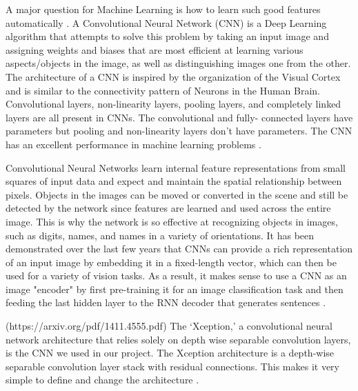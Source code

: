 \documentclass[conference]{IEEEtran}
\begin{document}
A major question for Machine Learning is how to learn such good features automatically \cite{b8}. A Convolutional Neural Network (CNN) is a Deep Learning algorithm that attempts to solve this problem by taking an input image and assigning weights and biases that are most efficient at learning various aspects/objects in the image, as well as distinguishing images one from the other. The architecture of a CNN is inspired by the organization of the Visual Cortex and is similar to the connectivity pattern of Neurons in the Human Brain. Convolutional layers, non-linearity layers, pooling layers, and completely linked layers are all present in CNNs. The convolutional and fully- connected layers have parameters but pooling and non-linearity layers don't have parameters. The CNN has an excellent performance in machine learning problems \cite{b8}.

Convolutional Neural Networks learn internal feature representations from small squares of input data and expect and maintain the spatial relationship between pixels. Objects in the images can be moved or converted in the scene and still be detected by the network since features are learned and used across the entire image. 
This is why the network is so effective at recognizing objects in images, such as digits, names, and names in a variety of orientations. It has been demonstrated over the last few years that CNNs can provide a rich representation of an input image by embedding it in a fixed-length vector, which can then be used for a variety of vision tasks.
As a result, it makes sense to use a CNN as an image "encoder" by first pre-training it for an image classification task and then feeding the last hidden layer to the RNN decoder that generates sentences \cite{b9}. 

(https://arxiv.org/pdf/1411.4555.pdf) The ‘Xception,' a convolutional neural network architecture that relies solely on depth wise separable convolution layers, is the CNN we used in our project. The Xception architecture is a depth-wise separable convolution layer stack with residual connections. This makes it very simple to define and change the architecture \cite{b10}.
\end{document}
